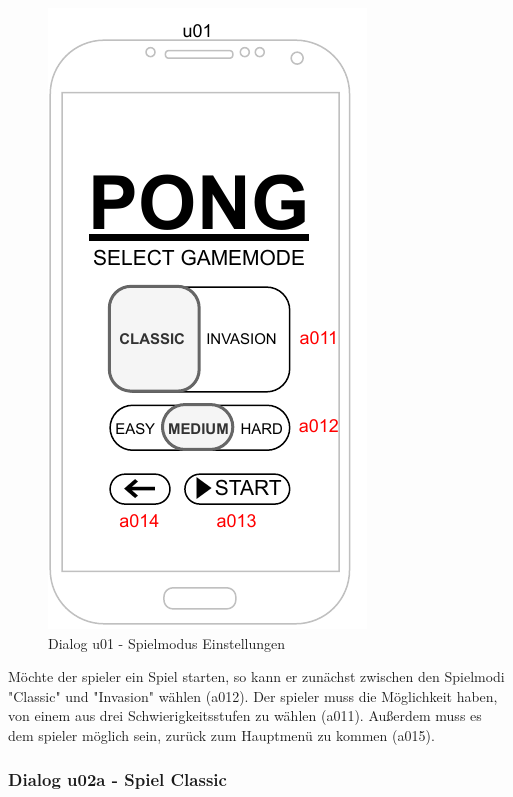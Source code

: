 \begin{figure}
    \begin{center}
    \includegraphics{diagramme/pdf/Mockup-u01.pdf}
    \end{center}
    \caption{Dialog u01 - Spielmodus Einstellungen}
\end{figure}

Möchte der \gls{spieler} ein Spiel starten, so kann er zunächst zwischen den Spielmodi "Classic" und "Invasion" wählen (a012). Der \gls{spieler} muss die Möglichkeit haben, von einem aus drei Schwierigkeitsstufen zu wählen (a011).
Außerdem muss es dem \gls{spieler} möglich sein, zurück zum Hauptmenü zu kommen (a015).
\clearpage

\subsubsection{Dialog u02a - Spiel Classic}

